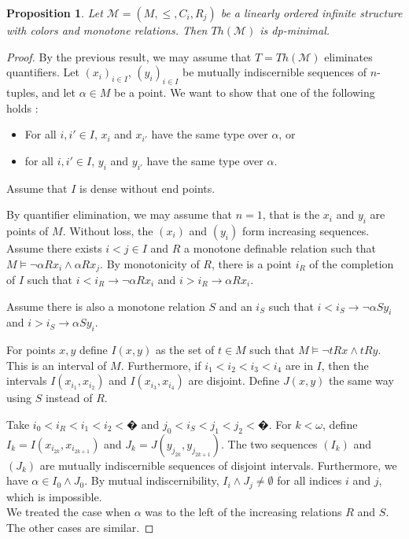 \documentclass[english]{article}
\newtheorem{prop}[thm]{Proposition}
\theoremstyle{definition}
\theoremstyle{mystyle}
\theoremstyle{remark}
\begin{document}
\begin{prop}\label{ordre}
Let $\mathcal M = (M,\leq,C_i,R_j)$ be a linearly ordered infinite structure with colors and monotone relations. Then $Th(\mathcal M)$ is dp-minimal.
\end{prop}
\begin{proof}
By the previous result, we may assume that $T= Th(\mathcal M)$ eliminates quantifiers. Let $(x_i)_{i \in I}$, $(y_i)_{i \in I}$ be mutually indiscernible sequences of $n$-tuples, and let $\alpha \in M$ be a point. We want to show that one of the following holds : 
\begin{itemize}
\item For all $i,i' \in I$, $x_i$ and $x_{i'}$ have the same type over $\alpha$, or
\item for all $i,i' \in I$, $y_i$ and $y_{i'}$ have the same type over $\alpha$.
\end{itemize}
Assume that $I$ is dense without end points.

By quantifier elimination, we may assume that $n=1$, that is the $x_i$ and $y_i$ are points of $M$. Without loss, the $(x_i)$ and $(y_i)$ form increasing sequences. Assume there exists $i<j \in I$ and $R$ a monotone definable relation such that $M \models \neg \alpha R x_i \wedge \alpha R x_j$. By monotonicity of $R$, there is a point $i_R$ of the completion of $I$ such that $i < i_R \rightarrow \neg \alpha R x_i$ and $i > i_R \rightarrow \alpha R x_i$.

Assume there is also a monotone relation $S$ and an $i_S$ such that $i < i_S \rightarrow \neg \alpha S y_i$ and $i > i_S \rightarrow \alpha S y_i$.

For points $x,y$ define $I(x,y)$ as the set of $t \in M$ such that $M \models \neg t R x \wedge t Ry$. This is an interval of $M$. Furthermore, if $i_1 < i_2 < i_3 < i_4$ are in $I$, then the intervals $I(x_{i_1},x_{i_2})$ and $I(x_{i_3},x_{i_4})$ are disjoint. Define $J(x,y)$ the same way using $S$ instead of $R$.

Take $i_0 < i_R < i_1 < i_2 < �$ and $j_0 < i_S < j_1 < j_2 < �$. For $k< \omega$, define $I_k = I(x_{i_{2k}},x_{i_{2k+1}})$ and $J_k = J(y_{j_{2k}},y_{j_{2k+1}})$. The two sequences $(I_k)$ and $(J_k)$ are mutually indiscernible sequences of disjoint intervals. Furthermore, we have $\alpha \in I_0 \wedge J_0$. By mutual indiscernibility,  $I_i \wedge J_j \neq \emptyset$ for all indices $i$ and $j$, which is impossible.
\\

We treated the case when $\alpha$ was to the left of the increasing relations $R$ and $S$. The other cases are similar.
\end{proof}
\end{document}
